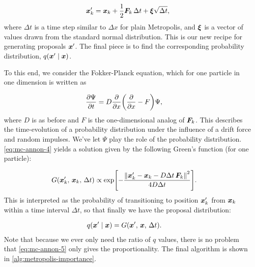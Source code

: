 \documentclass[Thesis.tex]{subfiles}
\begin{document}
\begin{align}
  \bm{x}_k' = \bm{x}_k + \frac{1}{2}\bm{F}_k\,\Delta t + \bm{\xi}\sqrt{\Delta t},
\end{align}
where $\Delta t$ is a time step similar to $\Delta x$ for plain Metropolis, and
$\bm{\xi}$ is a vector of values drawn from the standard normal distribution.
This is our new recipe for generating proposals $\bm{x}'$. The final piece is 
to find the corresponding probability distribution,
$q\qty(\bm{x}'\;\middle|\;\bm{x})$.

To this end, we consider the Fokker-Planck equation, which for one particle in
one dimension is written as

\begin{align}
  \label{eq:mc-annon-4}
  \pdv{\Psi}{t} &= D\pdv{}{x}\qty(\pdv{}{x} - F)\Psi,
\end{align}
where $D$ is as before and $F$ is the one-dimensional analog of $\bm{F}_k$. This
describes the time-evolution of a probability distribution under the influence
of a drift force and random impulses. We've let $\Psi$ play the role of the
probability distribution. \cref{eq:mc-annon-4} yields a solution given by the
following Green's function (for one particle):

\begin{align}
  \label{eq:mc-annon-5}
  G\qty(\bm{x}_k', \,\bm{x}_k,\,\Delta t) &\propto \exp[-\frac{\norm{\bm{x}_k' - \bm{x}_k - D\Delta t\,\bm{F}_k}^2}{4D\Delta t}].
\end{align}
This is interpreted as the probability of transitioning to position $\bm{x}_k'$
from $\bm{x}_k$ within a time interval $\Delta t$, so that finally we have the
proposal distribution:

\begin{align}
  q\qty(\bm{x}'\;\middle|\;\bm{x}) &=G\qty(\bm{x}', \,\bm{x},\,\Delta t). 
\end{align}
Note that because we ever only need the ratio of $q$ values, there is no problem
that \cref{eq:mc-annon-5} only gives the proportionality. The final algorithm is
shown in \cref{alg:metropolis-importance}.
\end{document}

